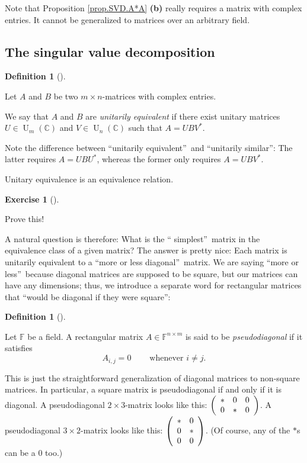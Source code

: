 \documentclass[numbers=enddot,12pt,final,onecolumn,notitlepage]{scrartcl}%
\newcounter{exer}
\numberwithin{exer}{subsection}
\theoremstyle{definition}
\newtheorem{defi}[theo]{Definition}
\newenvironment{definition}[1][]
{\begin{defi}[#1]\begin{leftbar}}
{\end{leftbar}\end{defi}}
\newtheorem{exmp}[exer]{Exercise}
\newenvironment{exercise}[1][]
{\begin{exmp}[#1]\begin{leftbar}}
{\end{leftbar}\end{exmp}}
\begin{document}
Note that Proposition \ref{prop.SVD.A*A} \textbf{(b)} really requires a matrix
with complex entries. It cannot be generalized to matrices over an arbitrary field.

\subsection{The singular value decomposition}

\begin{definition}
\label{def.svd.uniteq}Let $A$ and $B$ be two $m\times n$-matrices with complex entries.

We say that $A$ and $B$ are \emph{unitarily equivalent} if there exist unitary
matrices $U\in\operatorname*{U}\nolimits_{m}\left(  \mathbb{C}\right)  $ and
$V\in\operatorname*{U}\nolimits_{n}\left(  \mathbb{C}\right)  $ such that
$A=UBV^{\ast}$.
\end{definition}

Note the difference between \textquotedblleft unitarily
equivalent\textquotedblright\ and \textquotedblleft unitarily
similar\textquotedblright: The latter requires $A=UBU^{\ast}$, whereas the
former only requires $A=UBV^{\ast}$.

Unitary equivalence is an equivalence relation.

\begin{exercise}
 Prove this!
\end{exercise}

A natural question is therefore: What is the \textquotedblleft
simplest\textquotedblright\ matrix in the equivalence class of a given matrix?
The answer is pretty nice: Each matrix is unitarily equivalent to a
\textquotedblleft more or less diagonal\textquotedblright\ matrix. We are
saying \textquotedblleft more or less\textquotedblright\ because diagonal
matrices are supposed to be square, but our matrices can have any dimensions;
thus, we introduce a separate word for rectangular matrices that
\textquotedblleft would be diagonal if they were square\textquotedblright:

\begin{definition}
Let $\mathbb{F}$ be a field. A rectangular matrix $A\in\mathbb{F}^{n\times m}$
is said to be \emph{pseudodiagonal} if it satisfies%
\[
A_{i,j}=0\ \ \ \ \ \ \ \ \ \ \text{whenever }i\neq j.
\]

\end{definition}

This is just the straightforward generalization of diagonal matrices to
non-square matrices. In particular, a square matrix is pseudodiagonal if and
only if it is diagonal. A pseudodiagonal $2\times3$-matrix looks like this:
$\left(
\begin{array}
[c]{ccc}%
\ast & 0 & 0\\
0 & \ast & 0
\end{array}
\right)  $. A pseudodiagonal $3\times2$-matrix looks like this: $\left(
\begin{array}
[c]{cc}%
\ast & 0\\
0 & \ast\\
0 & 0
\end{array}
\right)  $. (Of course, any of the $\ast$s can be a $0$ too.)
\end{document}

